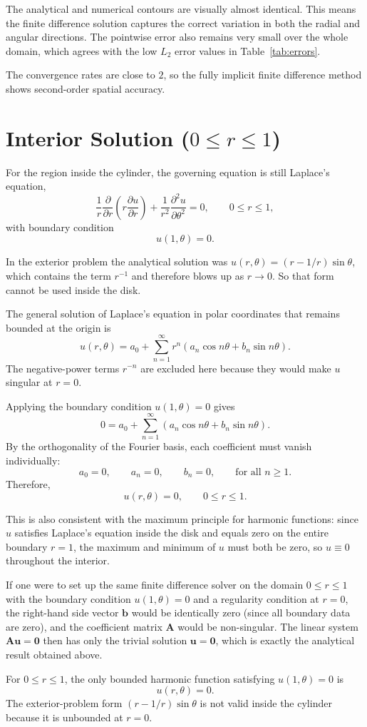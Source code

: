 \documentclass[12pt,a4paper]{article}
\begin{document}
The analytical and numerical contours are visually almost identical. This means the finite difference solution captures the correct variation in both the radial and angular directions. The pointwise error also remains very small over the whole domain, which agrees with the low $L_2$ error values in Table~\ref{tab:errors}.

\begin{resultbox}
The convergence rates are close to $2$, so the fully implicit finite difference method shows second-order spatial accuracy.
\end{resultbox}

\FloatBarrier

\section*{Interior Solution ($0\le r\le1$)}

For the region inside the cylinder, the governing equation is still Laplace's equation,
\[
\frac{1}{r}\frac{\partial}{\partial r}\left(r\frac{\partial u}{\partial r}\right)
+\frac{1}{r^2}\frac{\partial^2 u}{\partial \theta^2}=0,
\qquad 0\le r\le1,
\]
with boundary condition
\[u(1,\theta)=0.
\]

In the exterior problem the analytical solution was $u(r,\theta)=(r-1/r)\sin\theta$, which contains the term $r^{-1}$ and therefore blows up as $r\to 0$. So that form cannot be used inside the disk.

The general solution of Laplace's equation in polar coordinates that remains bounded at the origin is
\[u(r,\theta)=a_0+\sum_{n=1}^{\infty} r^n\left(a_n\cos n\theta+b_n\sin n\theta\right).
\]
The negative-power terms $r^{-n}$ are excluded here because they would make $u$ singular at $r=0$.

Applying the boundary condition $u(1,\theta)=0$ gives
\[
0=a_0+\sum_{n=1}^{\infty}\left(a_n\cos n\theta+b_n\sin n\theta\right).
\]
By the orthogonality of the Fourier basis, each coefficient must vanish individually:
\[
a_0=0,\qquad a_n=0,\qquad b_n=0,\qquad \text{for all } n\ge1.
\]
Therefore,
\[u(r,\theta)=0,\qquad 0\le r\le1.
\]

This is also consistent with the maximum principle for harmonic functions: since $u$ satisfies Laplace's equation inside the disk and equals zero on the entire boundary $r=1$, the maximum and minimum of $u$ must both be zero, so $u\equiv 0$ throughout the interior.

If one were to set up the same finite difference solver on the domain $0\le r\le1$ with the boundary condition $u(1,\theta)=0$ and a regularity condition at $r=0$, the right-hand side vector $\mathbf{b}$ would be identically zero (since all boundary data are zero), and the coefficient matrix $\mathbf{A}$ would be non-singular. The linear system $\mathbf{A}\mathbf{u}=\mathbf{0}$ then has only the trivial solution $\mathbf{u}=\mathbf{0}$, which is exactly the analytical result obtained above.

\begin{resultbox}
For $0\le r\le1$, the only bounded harmonic function satisfying $u(1,\theta)=0$ is
\[u(r,\theta)=0.
\]
The exterior-problem form $(r-1/r)\sin\theta$ is not valid inside the cylinder because it is unbounded at $r=0$.
\end{resultbox}
\end{document}
